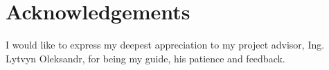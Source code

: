 \thispagestyle{empty}
\section*{Acknowledgements}

I would like to express my deepest appreciation to my project advisor, Ing. Lytvyn Oleksandr, for being my guide, his patience and feedback.

\newpage
\thispagestyle{empty}
\mbox{}
\newpage